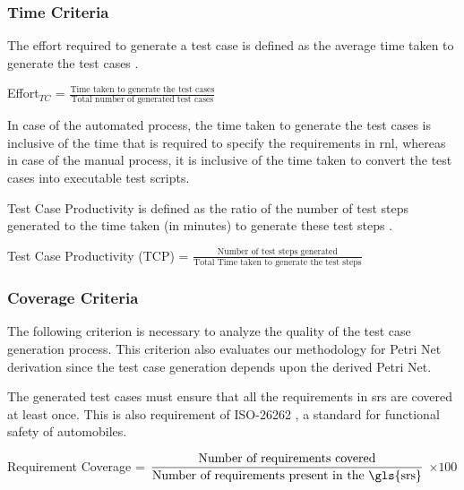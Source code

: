 \subsubsection{\textbf{Time Criteria}}

\begin{definition}
\label{def:def5}

The effort required to generate a test case is defined as the average time taken to generate the test cases \cite{elghondakly2015waterfall}.

Effort$_{TC}$   = $\displaystyle\frac{\mbox{Time taken to generate the test cases}}{\mbox{Total number of generated test cases}}$

In case of the automated process, the time taken to generate the test cases is inclusive of the time that is required to specify the requirements in \gls{rnl}, whereas in case of the manual process, it is inclusive of the time taken to convert the test cases into executable test scripts.
\end{definition}

\begin{definition}
\label{def:def6}

Test Case Productivity is defined as the ratio of the number of test steps generated to the time taken (in minutes) to generate these test steps \cite{gulechha2009software}.

Test Case Productivity (TCP)   = $\displaystyle\frac{\mbox{Number of test steps generated}}{\mbox{Total Time taken to generate the test steps}}$
\end{definition}

\subsubsection{\textbf{Coverage Criteria}}
The following criterion is necessary to analyze the quality of the test case generation process. This criterion also evaluates our methodology for Petri Net derivation since the test case generation depends upon the derived Petri Net.

\begin{definition}
\label{def:def7}

The generated test cases must ensure that all the requirements in \gls{srs} are covered at least once. This is also requirement of ISO-26262 \cite{iso201126262}, a standard for functional safety of automobiles.

Requirement Coverage = $\displaystyle\frac{\mbox{Number of requirements covered}}{\mbox{Number of requirements present in the \gls{srs}}}$  $\times 100$
\end{definition}


